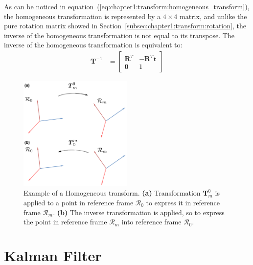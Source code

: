 As can be noticed in equation~(\ref{eq:chapter1:transform:homogeneous_transform}), the homogeneous transformation is represented by a $4 \times 4$ matrix, and unlike the pure rotation matrix showed in Section~\ref{subsec:chapter1:transform:rotation}, the inverse of the homogeneous transformation is not equal to its transpose. The inverse of the homogeneous transformation is equivalent to:
\begin{align}
    \bm{T}^{-1} &= \begin{bmatrix}
        \bm{R}^T & -\bm{R}^T\bm{t} \\
        \bm{0} & 1
    \end{bmatrix}
\end{align}

\begin{figure}
    \centering
    \includegraphics[width=0.5\textwidth]{Images/fig15-homogeneous-transform.png}
    \caption[Example of a Homogeneous transform]{Example of a Homogeneous transform. \textbf{(a)} Transformation $\bm{T}_m^0$ is applied to a point in reference frame $\mathcal{R}_0$ to express it in reference frame $\mathcal{R}_m$. \textbf{(b)} The inverse transformation is applied, so to express the point in reference frame $\mathcal{R}_m$ into reference frame $\mathcal{R}_0$.  \cite{bona-dynamic-modelling}}
    \label{fig:chapter1:transform:homogeneous}
\end{figure}

\section{Kalman Filter}
\label{sec:chapter1:kf}

